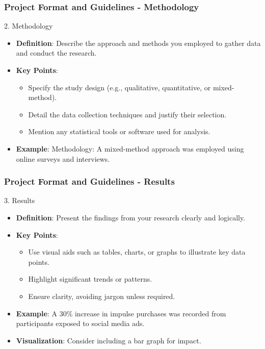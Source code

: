 \documentclass[aspectratio=169]{beamer}
\begin{document}
\begin{frame}[fragile]
    \frametitle{Project Format and Guidelines - Methodology}
    \begin{block}{2. Methodology}
        \begin{itemize}
            \item \textbf{Definition}: Describe the approach and methods you employed to gather data and conduct the research.
            \item \textbf{Key Points}:
                \begin{itemize}
                    \item Specify the study design (e.g., qualitative, quantitative, or mixed-method).
                    \item Detail the data collection techniques and justify their selection.
                    \item Mention any statistical tools or software used for analysis.
                \end{itemize}
            \item \textbf{Example}: Methodology: A mixed-method approach was employed using online surveys and interviews.
        \end{itemize}
    \end{block}
\end{frame}

\begin{frame}[fragile]
    \frametitle{Project Format and Guidelines - Results}
    \begin{block}{3. Results}
        \begin{itemize}
            \item \textbf{Definition}: Present the findings from your research clearly and logically.
            \item \textbf{Key Points}:
                \begin{itemize}
                    \item Use visual aids such as tables, charts, or graphs to illustrate key data points.
                    \item Highlight significant trends or patterns.
                    \item Ensure clarity, avoiding jargon unless required.
                \end{itemize}
            \item \textbf{Example}: A 30\% increase in impulse purchases was recorded from participants exposed to social media ads.
            \item \textbf{Visualization}: Consider including a bar graph for impact.
        \end{itemize}
    \end{block}
\end{frame}
\end{document}

